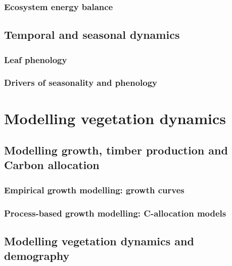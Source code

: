 \documentclass[]{book}
\begin{document}
\section{Ecosystem energy balance}\label{ecosystem-energy-balance}

\chapter{Temporal and seasonal
dynamics}\label{temporal-and-seasonal-dynamics}


\section{Leaf phenology}\label{leaf-phenology}

\section{Drivers of seasonality and
phenology}\label{drivers-of-seasonality-and-phenology}

\part{Modelling vegetation
dynamics}\label{part-modelling-vegetation-dynamics}

\chapter{Modelling growth, timber production and Carbon
allocation}\label{modelling-growth-timber-production-and-carbon-allocation}


\section{Empirical growth modelling: growth
curves}\label{empirical-growth-modelling-growth-curves}

\section{Process-based growth modelling: C-allocation
models}\label{process-based-growth-modelling-c-allocation-models}

\chapter{Modelling vegetation dynamics and
demography}\label{modelling-vegetation-dynamics-and-demography}
\end{document}
